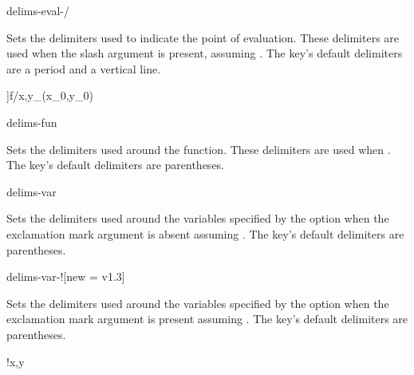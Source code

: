 \clearpage

\begin{option}{delims-eval-/}
	\begin{values}[default = .~\cs{rvert}]
	\end{values}
	Sets the delimiters used to indicate the point of evaluation. These delimiters are used when the slash argument is present, assuming . The key's default delimiters are a period and a vertical line.
	\begin{example}
		\pdv[delims-eval-/=[]]{f}/{x,y}_{(x_0,y_0)}
	\end{example}
\end{option}

\begin{option}{delims-fun}
	\begin{values}[default = (~)]
		\meta{right delimiter}
	\end{values}
	Sets the delimiters used around the function. These delimiters are used when . The key's default delimiters are parentheses.
	\begin{example}
		\pdv[delims-fun=\langle\rangle, fun]{f}{x,y}
	\end{example}
\end{option}

\begin{option}{delims-var}
	\begin{values}[default = (~)]
	\end{values}
	Sets the delimiters used around the variables specified by the  option when the exclamation mark argument is absent assuming . The key's default delimiters are parentheses.
	\begin{example}
		\pdv[delims-var=\{\}, var]{f}{x,y}
	\end{example}
\end{option}

\begin{option}{delims-var-!}[new = v1.3]
	\begin{values}[default = (~)]
	\end{values}
	Sets the delimiters used around the variables specified by the  option when the exclamation mark argument is present assuming . The key's default delimiters are parentheses.
	\begin{example}
		!{x,y}
	\end{example}
\end{option}


